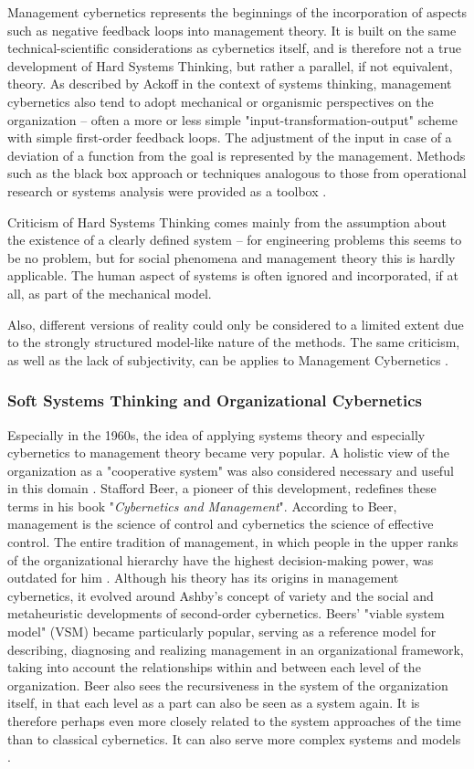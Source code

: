 \documentclass[a4paper,12pt]{article}
\begin{document}
Management cybernetics represents the beginnings of the incorporation of
aspects such as negative feedback loops into management theory. It is built on
the same technical-scientific considerations as cybernetics itself, and is
therefore not a true development of Hard Systems Thinking, but rather a
parallel, if not equivalent, theory. As described by Ackoff in the context of
systems thinking, management cybernetics also tend to adopt mechanical or
organismic perspectives on the organization -- often a more or less simple
"input-transformation-output" scheme with simple first-order feedback loops.
The adjustment of the input in case of a deviation of a function from the goal
is represented by the management. Methods such as the black box approach or
techniques analogous to those from operational research or systems analysis
were provided as a toolbox \cite{jackson:1991}.

Criticism of Hard Systems Thinking comes mainly from the assumption about the
existence of a clearly defined system -- for engineering problems this seems to
be no problem, but for social phenomena and management theory this is hardly
applicable. The human aspect of systems is often ignored and incorporated, if
at all, as part of the mechanical model.

Also, different versions of reality could only be considered to a limited
extent due to the strongly structured model-like nature of the methods. The
same criticism, as well as the lack of subjectivity, can be applies to
Management Cybernetics \cite{jackson:1991}.

\subsubsection{Soft Systems Thinking  and Organizational Cybernetics}

Especially in the 1960s, the idea of applying systems theory and especially
cybernetics to management theory became very popular. A holistic view of the
organization as a "cooperative system" was also considered necessary and
useful in this domain \cite{jackson:1991}. Stafford Beer, a pioneer of this
development, redefines these terms in his book "\textit{Cybernetics and
  Management}". According to Beer, management is the science of control and
cybernetics the science of effective control. The entire tradition of
management, in which people in the upper ranks of the organizational hierarchy
have the highest decision-making power, was outdated for him \cite{beer:1959}.
Although his theory has its origins in management cybernetics, it evolved
around Ashby's concept of variety and the social and metaheuristic
developments of second-order cybernetics. Beers' "viable system model" (VSM)
became particularly popular, serving as a reference model for describing,
diagnosing and realizing management in an organizational framework, taking
into account the relationships within and between each level of the
organization. Beer also sees the recursiveness in the system of the
organization itself, in that each level as a part can also be seen as a system
again. It is therefore perhaps even more closely related to the system
approaches of the time than to classical cybernetics. It can also serve more
complex systems and models \cite{jackson:2003}.
\end{document}
